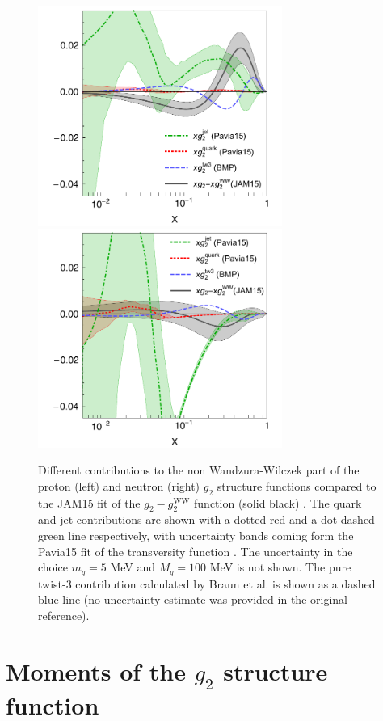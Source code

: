 \documentclass[preprintnumbers,floatfix,nofootinbib]{revtex4}
\newcommand{\mj}{M_q}
\begin{document}
\begin{figure}[tb]
\begin{center}
\includegraphics[width=8cm]{g2contrib}
\includegraphics[width=8cm]{g2contribN}
\vskip-0.2cm
\caption{\label{f:g2contrib} 
Different contributions to the non Wandzura-Wilczek part of the proton (left)
and neutron (right) $g_2$ structure functions compared to the JAM15 fit of the
$g_2-g_2^{\text{WW}}$ function (solid black) \cite{Sato:2016tuz}. The quark and jet
contributions are shown with a dotted red and a dot-dashed green line
respectively, with uncertainty bands coming form the Pavia15 fit of the
transversity function \cite{Radici:2015mwa}. The uncertainty in the choice
$m_q=5$ MeV and $\mj=100$ MeV is not shown. The pure twist-3 contribution
calculated by Braun et al. \cite{Braun:2011aw} is shown as a dashed blue line
(no uncertainty estimate was provided in the original reference). 
}
\end{center}
\end{figure}

\section{Moments of the $g_2$ structure function}
\label{sec:moments}
\end{document}
